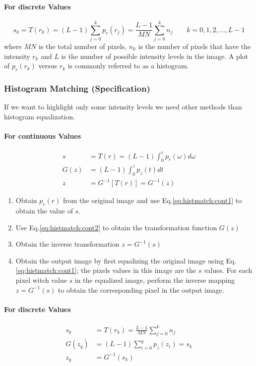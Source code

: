 \paragraph{For discrete Values}
\begin{equation}
	s_k = T(r_k) = (L-1) \sum_{j=0}^k p_r(r_j) = \frac{L-1}{MN} \sum_{j=0}^k n_j \qquad k = 0,1,2,\ldots, L-1
\end{equation}
where $MN$ is the total number of pixels, $n_k$ is the number of pixels that have the intensity $r_k$ and $L$ is the number of possible intensity levels in the image.
A plot of $p_r(r_k)$ versus $r_k$ is commonly referred to as a histogram.


\subsubsection{Histogram Matching (Specification) }
If we want to highlight only some intensity levels we need other methods than histogram equalization.

\paragraph{For continuous Values}
\begin{align}
	s	&= T(r) = (L-1) \int_0^r p_r(\omega) d\omega \label{eq:histmatch:cont1} \\
	G(z)&= (L-1) \int_0^z p_z(t) dt \label{eq:histmatch:cont2} \\
	z 	&= G^{-1}[T(r)] = G^{-1}(z) \label{eq:histmatch:cont3}
\end{align}

\begin{enumerate}
  \item Obtain $p_r(r)$ from the original image and use Eq.\ref{eq:histmatch:cont1} to obtain the value of $s$.
  \item Use Eq.\ref{eq:histmatch:cont2} to obtain the transformation function $G(z)$
  \item Obtain the inverse transformation $z = G^{-1}(s)$
  \item Obtain the output image by first equalizing the original image using Eq.\ref{eq:histmatch:cont1}; the pixels values in this image are the $s$ values.
  	For each pixel witch value $s$ in the equalized image, perform the inverse mapping $z = G^{-1}(s)$ to obtain the corresponding pixel in the output image. 
\end{enumerate}

\paragraph{For discrete Values}
\begin{align}
	s_k		&= T(r_k) = \frac{L-1}{MN}\sum_{j=0}^{k} n_j \label{eq:histmatch:disc1} \\
	G(z_q)	&= (L-1) \sum_{i=0}^q p_z(z_i) = s_k \label{eq:histmatch:disc2}  \\
	z_q 	&= G^{-1}(s_k)	 
\end{align}

